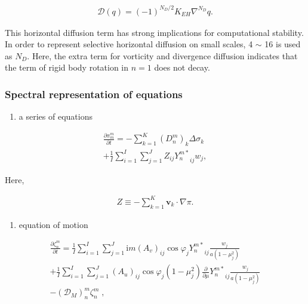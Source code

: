 \begin{eqnarray}
    {\mathcal D}(q) = (-1)^{N_D/2} K_{EH} \nabla^{N_D} q .
\end{eqnarray}

This horizontal diffusion term has strong implications for computational
stability. In order to represent selective horizontal diffusion on small
scales, 4 \(\sim\) 16 is used as \(N_D\). Here, the extra term for
vorticity and divergence diffusion indicates that the term of rigid body
rotation in \(n=1\) does not decay.

\hypertarget{spectral-representation-of-equations}{%
\subsubsection{Spectral representation of
equations}\label{spectral-representation-of-equations}}

\begin{enumerate}
\def\labelenumi{\arabic{enumi}.}
\tightlist
\item
  a series of equations
\end{enumerate}

\begin{eqnarray}
  \frac{\partial{\pi_m^m}}{\partial {t}}
  =  - \sum_{k=1}^{K} (D_n^m)_k \Delta  \sigma_k  \\
     + \frac{1}{I} \sum_{i=1}^{I} \sum_{j=1}^{J}  
               Z_{ij} {Y_n^{m *}}_{ij} w_j  ,
\end{eqnarray}

Here,

\begin{eqnarray}
Z \equiv - \sum_{k=1}^{K} \mathbf{v}_k \cdot \nabla \pi .
\end{eqnarray}

\begin{enumerate}
\def\labelenumi{\arabic{enumi}.}
\setcounter{enumi}{1}
\tightlist
\item
  equation of motion
\end{enumerate}

\begin{eqnarray}
  \frac{\partial{\zeta_n^m}}{\partial {t}}
    =  \frac{1}{I} \sum_{i=1}^{I} \sum_{j=1}^{J}  
          \mathrm{i}m (A_v)_{ij} \cos\varphi_j
          {Y_n^{m *}}_{ij}
         \frac{w_j}{a(1-\mu_j^{2})}
         \\
    +    \frac{1}{I} \sum_{i=1}^{I} \sum_{j=1}^{J}  
          (A_u)_{ij} \cos\varphi_j
          (1-\mu_j^2)
          \frac{\partial }{\partial \mu} {Y_n^{m *}}_{ij}
          \frac{w_j}{a(1-\mu_j^{2})}
          \\
    -   ({\mathcal D}_M)_n^m \zeta_n^m  \; ,
\end{eqnarray}

